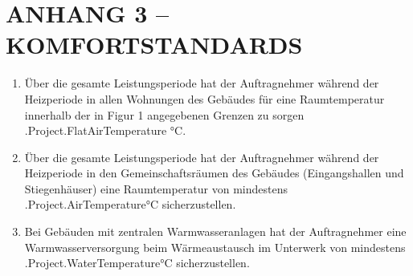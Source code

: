 \section{ANHANG 3 – KOMFORTSTANDARDS}

\begin{enumerate}[label=\arabic*.]
	\item Über die gesamte Leistungsperiode hat der Auftragnehmer während der Heizperiode in allen Wohnungen des Gebäudes für eine Raumtemperatur innerhalb der in Figur 1 angegebenen Grenzen zu sorgen \iffalse input project.flat_airtemp value="{{.Project.FlatAirTemperature}}" \fi {{.Project.FlatAirTemperature}} °C. \@

	\item Über die gesamte Leistungsperiode hat der Auftragnehmer während der Heizperiode in den Gemeinschaftsräumen des Gebäudes (Eingangshallen und Stiegenhäuser) eine Raumtemperatur von mindestens \iffalse input project.airtemp value="{{.Project.AirTemperature}}" \fi {{.Project.AirTemperature}}°C sicherzustellen.

	\item Bei Gebäuden mit zentralen Warmwasseranlagen hat der Auftragnehmer eine Warmwasserversorgung beim Wärmeaustausch im Unterwerk von mindestens \iffalse input project.watertemp value="{{.Project.WaterTemperature}}" \fi {{.Project.WaterTemperature}}°C sicherzustellen.
\end{enumerate}
